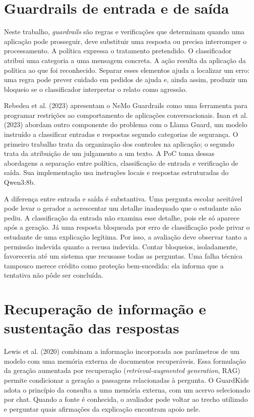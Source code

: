 \section{Guardrails de entrada e de saída}

Neste trabalho, \textit{guardrails} são regras e verificações que determinam quando uma aplicação pode prosseguir, deve substituir uma resposta ou precisa interromper o processamento. A política expressa o tratamento pretendido. O classificador atribui uma categoria a uma mensagem concreta. A ação resulta da aplicação da política ao que foi reconhecido. Separar esses elementos ajuda a localizar um erro: uma regra pode prever cuidado em pedidos de ajuda e, ainda assim, produzir um bloqueio se o classificador interpretar o relato como agressão.

Rebedea et al. (2023) apresentam o NeMo Guardrails como uma ferramenta para programar restrições ao comportamento de aplicações conversacionais. Inan et al. (2023) abordam outro componente do problema com o Llama Guard, um modelo instruído a classificar entradas e respostas segundo categorias de segurança. O primeiro trabalho trata da organização dos controles na aplicação; o segundo trata da atribuição de um julgamento a um texto. A PoC toma dessas abordagens a separação entre política, classificação de entrada e verificação de saída. Sua implementação usa instruções locais e respostas estruturadas do Qwen3:8b.

A diferença entre entrada e saída é substantiva. Uma pergunta escolar aceitável pode levar o gerador a acrescentar um detalhe inadequado que o estudante não pediu. A classificação da entrada não examina esse detalhe, pois ele só aparece após a geração. Já uma resposta bloqueada por erro de classificação pode privar o estudante de uma explicação legítima. Por isso, a avaliação deve observar tanto a permissão indevida quanto a recusa indevida. Contar bloqueios, isoladamente, favoreceria até um sistema que recusasse todas as perguntas. Uma falha técnica tampouco merece crédito como proteção bem-sucedida: ela informa que a tentativa não pôde ser concluída.

\section{Recuperação de informação e sustentação das respostas}

Lewis et al. (2020) combinam a informação incorporada aos parâmetros de um modelo com uma memória externa de documentos recuperáveis. Essa formulação da geração aumentada por recuperação (\textit{retrieval-augmented generation}, RAG) permite condicionar a geração a passagens relacionadas à pergunta. O GuardKids adota o princípio da consulta a uma memória externa, com um acervo selecionado por chat. Quando a fonte é conhecida, o avaliador pode voltar ao trecho utilizado e perguntar quais afirmações da explicação encontram apoio nele.

